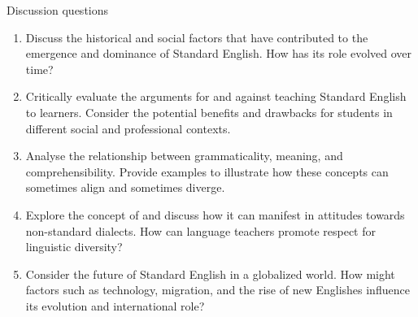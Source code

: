 \begin{tblslineshorizontal}{Discussion questions}

\begin{enumerate}[noitemsep]
    \item Discuss the historical and social factors that have contributed to the emergence and dominance of Standard English. How has its role evolved over time?
    \item Critically evaluate the arguments for and against teaching Standard English to learners. Consider the potential benefits and drawbacks for students in different social and professional contexts.
    \item Analyse the relationship between grammaticality, meaning, and comprehensibility. Provide examples to illustrate how these concepts can sometimes align and sometimes diverge.
    \item Explore the concept of  and discuss how it can manifest in attitudes towards non-standard dialects. How can language teachers promote respect for linguistic diversity?
    \item Consider the future of Standard English in a globalized world. How might factors such as technology, migration, and the rise of new Englishes influence its evolution and international role?
\end{enumerate}
\end{tblslineshorizontal}
